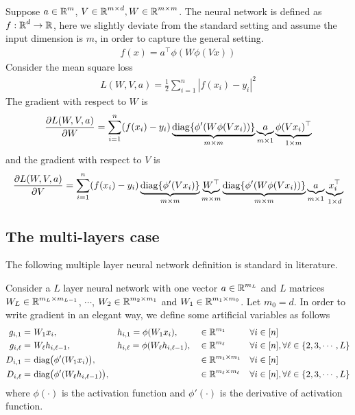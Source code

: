 Suppose $a \in \operatorname{{\mathbb R}}^m$, $V \in \operatorname{{\mathbb R}}^{m \times d}, W \in \operatorname{{\mathbb R}}^{m \times m}$. The neural network is defined as $f : \operatorname{{\mathbb R}}^d \rightarrow \operatorname{{\mathbb R}}$, here we slightly deviate from the standard setting and assume the input dimension is $m$, in order to capture the general setting.
\begin{align*}
f(x) = a^{\top} \phi( W \phi ( V x ) )
\end{align*}
Consider the mean square loss
\begin{align*}
L(W, V, a) = \frac{1}{2} \sum_{i=1}^n | f(x_i) - y_i |^2
\end{align*}
The gradient with respect to $W$ is
\begin{align*}
\frac{ \partial L(W, V, a)}{ \partial W } = \sum_{i=1}^{n}(f(x_i) - y_i)  \underbrace{ \mathrm{diag}\{\phi'(W \phi(Vx_i))\} }_{ m \times m }\underbrace{ a }_{m \times 1}  \underbrace{ \phi(Vx_i)^{\top} }_{1 \times m}  
\end{align*}
and the gradient with respect to $V$ is
\begin{align*}
\frac{ \partial L(W, V, a)}{ \partial V } = \sum_{i=1}^{n}(f(x_i) - y_i)\underbrace{\mathrm{diag}\{ \phi'(Vx_i)\}}_{m \times m} \underbrace{W^{\top}}_{m \times m}  \underbrace{\mathrm{diag}\{\phi'(W \phi(Vx_i))\}}_{m \times m} \underbrace{a}_{m \times 1}    \underbrace{x_i^{\top}}_{1 \times d} 
\end{align*}

\subsection{The multi-layers case}\label{sec:gradient_l}


The following multiple layer neural network definition is standard in literature. %

Consider a $L$ layer neural network with one vector $a\in \operatorname{{\mathbb R}}^{m_L}$ and $L$ matrices $W_L \in \operatorname{{\mathbb R}}^{m_L \times m_{L-1}}$, $\cdots$, $W_2 \in \operatorname{{\mathbb R}}^{m_2 \times m_1}$ and $W_1 \in \operatorname{{\mathbb R}}^{m_1 \times m_0}$. Let $m_0 = d$.
In order to write gradient in an elegant way, we define some artificial variables as follows
\begin{align}\label{eq:def_g_h}
g_{i,1} = & ~ W_1 x_i, && h_{i,1} = \phi(W_1 x_i), && \in \operatorname{{\mathbb R}}^{m_1} && \forall i \in [n]\notag\\
g_{i,\ell} = & ~ W_{\ell} h_{i,\ell-1}, && h_{i,\ell} = \phi( W_{\ell} h_{i,\ell-1} ), && \in \operatorname{{\mathbb R}}^{m_{\ell}} && \forall i \in [n], \forall \ell \in \{2,3,\cdots,L\} \\
D_{i, 1} = & ~ \text{diag} \big(\phi'(W_1 x_i )\big), && && \in \operatorname{{\mathbb R}}^{m_1 \times m_1} && \forall i \in [n] \notag\\
D_{i, \ell} = & ~ \text{diag} \big(\phi'(W_{\ell} h_{i, \ell-1})\big), && && \in \operatorname{{\mathbb R}}^{m_{\ell} \times m_{\ell}} && \forall i \in [n], \forall \ell \in \{2,3,\cdots,L\} \notag
\end{align}
where $\phi(\cdot)$ is the activation function and $\phi'(\cdot)$ is the derivative of activation function. 



